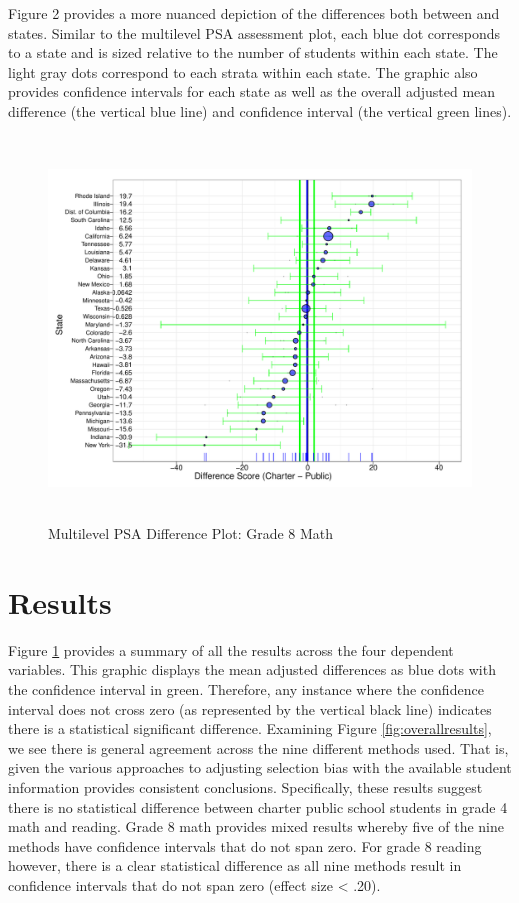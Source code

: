 \documentclass[man,floatsintext]{apa6}
\begin{document}
Figure 2 provides a more nuanced depiction of the differences both between and states. Similar to the multilevel PSA assessment plot, each blue dot corresponds to a state and is sized relative to the number of students within each state. The light gray dots correspond to each strata within each state. The graphic also provides confidence intervals for each state as well as the overall adjusted mean difference (the vertical blue line) and confidence interval (the vertical green lines).

\begin{figure}[t]
\begin{center}
\includegraphics[height=4in]{../Figures/g8mathlrdiffplot.pdf}
\caption{Multilevel PSA Difference Plot: Grade 8 Math}
\label{fig:g8math:diff}
\end{center}
\end{figure}

\section{Results}

Figure \ref{fig:g8math:diff} provides a summary of all the results across the four dependent variables. This graphic displays the mean adjusted differences as blue dots with the confidence interval in green. Therefore, any instance where the confidence interval does not cross zero (as represented by the vertical black line) indicates there is a statistical significant difference. Examining Figure \ref{fig:overallresults}, we see there is general agreement across the nine different methods used. That is, given the various approaches to adjusting selection bias with the available student information provides consistent conclusions. Specifically, these results suggest there is no statistical difference between charter public school students in grade 4 math and reading. Grade 8 math provides mixed results whereby five of the nine methods have confidence intervals that do not span zero. For grade 8 reading however, there is a clear statistical difference as all nine methods result in confidence intervals that do not span zero (effect size < .20).
\end{document}

